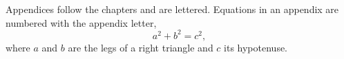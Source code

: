 \label{app:data}

Appendices follow the chapters and are lettered. Equations in an appendix are numbered with the appendix letter,
\begin{equation}
  a^2 + b^2 = c^2,
  \label{eq:appendix:pythagoras}
\end{equation}
where $a$ and $b$ are the legs of a right triangle and $c$ its hypotenuse.
